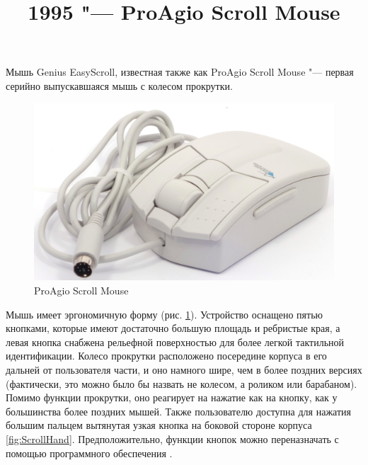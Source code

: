 \documentclass[11pt, a4paper]{article}
\begin{document}
\title{1995 "--- ProAgio Scroll Mouse}
\date{}
\maketitle

Мышь Genius EasyScroll, известная также как ProAgio Scroll Mouse "--- первая серийно выпускавшаяся мышь с колесом прокрутки.

\begin{figure}[h]
    \centering
    \includegraphics[scale=0.5]{1995_pro_agio_scroll_mouse/pic_30.jpg}
    \caption{ProAgio Scroll Mouse}
    \label{fig:ScrollPic}
\end{figure}


Мышь имеет эргономичную форму (рис. \ref{fig:ScrollPic}). Устройство оснащено пятью кнопками, которые имеют достаточно большую площадь и ребристые края, а левая кнопка снабжена рельефной поверхностью для более легкой тактильной идентификации. Колесо прокрутки расположено посередине корпуса в его дальней от пользователя части, и оно намного шире, чем в более поздних версиях (фактически, это можно было бы назвать не колесом, а роликом или барабаном). Помимо функции прокрутки, оно реагирует на нажатие как на кнопку, как у большинства более поздних мышей. Также пользователю доступна для нажатия большим пальцем вытянутая узкая кнопка на боковой стороне корпуса \ref{fig:ScrollHand}. Предположительно, функции кнопок можно переназначать с помощью программного обеспечения \cite{yt}.
\end{document}
